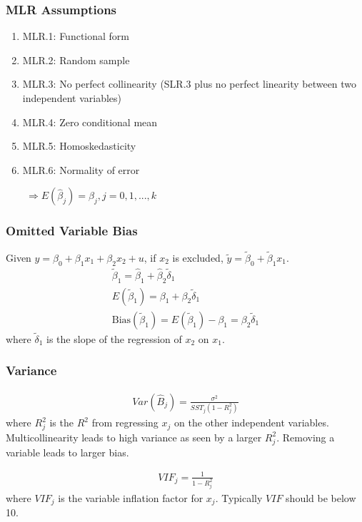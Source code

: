 \documentclass[12pt]{article}
\numberwithin{equation}{section}
\begin{document}
\subsubsection{MLR Assumptions}
\begin{enumerate}
    \item MLR.1: Functional form
    \item MLR.2: Random sample
    \item MLR.3: No perfect collinearity (SLR.3 plus no perfect linearity between two independent variables)
    \item MLR.4: Zero conditional mean
    \item MLR.5: Homoskedasticity
    \item MLR.6: Normality of error
\end{enumerate}
$\qquad \Rightarrow E(\hat{\beta}_j) = \beta_j, j = 0, 1, ..., k$

\subsubsection{Omitted Variable Bias}
Given $y = \beta_0 + \beta_1 x_1 + \beta_2 x_2 + u$, if $x_2$ is excluded, $\tilde{y} = \tilde{\beta}_0 + \tilde{\beta}_1 x_1$.
\begin{gather}
    \tilde{\beta}_1 = \hat{\beta}_1 + \hat{\beta}_2 \tilde{\delta}_1 \\
    E(\tilde{\beta}_1) = \beta_1 + \beta_2 \tilde{\delta}_1 \\
    \text{Bias}(\tilde{\beta}_1) = E(\tilde{\beta}_1) - \beta_1 = \beta_2 \tilde{\delta}_1
\end{gather}
where $\tilde{\delta}_1$ is the slope of the regression of $x_2$ on $x_1$.

\subsubsection{Variance}
\begin{gather}
    Var(\hat{B}_j) = \frac{\sigma^2}{SST_j(1-R_j^2)}
\end{gather}
where $R_j^2$ is the $R^2$ from regressing $x_j$ on the other independent variables.\\[0.5cm]
Multicollinearity leads to high variance as seen by a larger $R_j^2$. Removing a variable leads to larger bias.

\begin{gather}
    VIF_j = \frac{1}{1-R_j^2}
\end{gather}
where $VIF_j$ is the variable inflation factor for $x_j$. Typically $VIF$ should be below 10.
\end{document}
